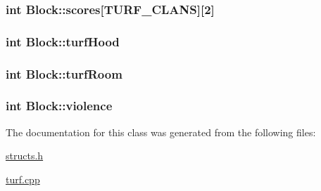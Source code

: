 \hypertarget{classBlock_a4d1441123e6e6cc6d12184fc6e639186}{
\subsubsection[{scores}]{\setlength{\rightskip}{0pt plus 5cm}int Block\-::scores\mbox{[}{\bf T\-U\-R\-F\-\_\-\-C\-L\-A\-N\-S}\mbox{]}\mbox{[}2\mbox{]}}}\label{classBlock_a4d1441123e6e6cc6d12184fc6e639186}
\hypertarget{classBlock_a174ece7b61ffa487286bdd2fc487c510}{
\subsubsection[{turf\-Hood}]{\setlength{\rightskip}{0pt plus 5cm}int Block\-::turf\-Hood}}\label{classBlock_a174ece7b61ffa487286bdd2fc487c510}
\hypertarget{classBlock_a7d080c6c349d17e582d63405d40ba4b7}{
\subsubsection[{turf\-Room}]{\setlength{\rightskip}{0pt plus 5cm}int Block\-::turf\-Room}}\label{classBlock_a7d080c6c349d17e582d63405d40ba4b7}
\hypertarget{classBlock_ab0df0d90035b29fed825caa9f8008bab}{
\subsubsection[{violence}]{\setlength{\rightskip}{0pt plus 5cm}int Block\-::violence}}\label{classBlock_ab0df0d90035b29fed825caa9f8008bab}


The documentation for this class was generated from the following files\-:\begin{DoxyCompactItemize}
\item 
\hyperlink{structs_8h}{structs.\-h}\item 
\hyperlink{turf_8cpp}{turf.\-cpp}\end{DoxyCompactItemize}
